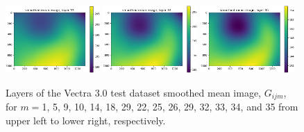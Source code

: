 \documentclass[letterpaper,11pt]{article}
\begin{document}
\begin{figure}[!ht]
\includegraphics[width=0.32\textwidth]{images/results/smoothed_mean_image_layers_vectra/smoothed_mean_image_layer_33}
\includegraphics[width=0.32\textwidth]{images/results/smoothed_mean_image_layers_vectra/smoothed_mean_image_layer_34}
\includegraphics[width=0.32\textwidth]{images/results/smoothed_mean_image_layers_vectra/smoothed_mean_image_layer_35}
\caption{\footnotesize Layers of the Vectra 3.0 test dataset smoothed mean image, $G_{ijm}$, for $m=$1, 5, 9, 10, 14, 18, 29, 22, 25, 26, 29, 32, 33, 34, and 35 from upper left to lower right, respectively.}
\label{fig:uncorrected_mean_image_layers_vectra}
\end{figure}
\end{document}
